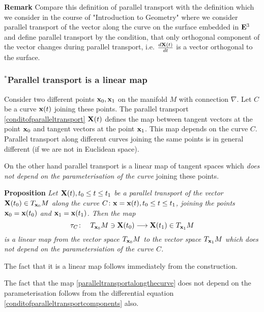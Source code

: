 \documentclass[12pt]{article}
\theoremstyle{theorem}
\numberwithin{equation}{section}
\begin{document}
{  \m


{\bf Remark} Compare this definition of parallel transport with the definition which we consider
in the course of "Introduction to Geometry" where we consider parallel transport of the vector along the
curve on the surface embedded in ${\bf E}^3$ and define parallel transport by the condition, that only orthogonal component
of the vector changes during parallel transport, i.e.
${d{\bf X}(t)\over dt}$ is a vector orthogonal to the surface.

\subsubsection {$^*$Parallel transport is a linear map }

{\small Consider two different points ${\bf x}_0,{\bf x}_1$ on the manifold  $M$ with connection $\nabla$.
Let $C$ be a curve ${\bf x}(t)$ joining these points.
The parallel transport \eqref{conditofparalleltransport}  ${\bf X}(t)$ defines the map between  tangent vectors
at the point ${\bf x}_0$ and tangent vectors at the point ${\bf x}_1$. This map depends on the curve $C$. Parallel
transport along different curves joining the same points is in general different (if we are not in Euclidean space).

On the other hand parallel transport is a linear map of tangent spaces which {\it does not depend on the
parameterisation of the curve} joining these points.

\m

{\bf Proposition}  {\it Let ${\bf X}(t), t_0\leq t\leq t_1$ be a parallel transport of the vector ${\bf X}(t_0)\in T_{{\bf x}_0}M$
along the curve $C\colon {\bf x}={\bf x}(t), t_0\leq t\leq t_1$, joining the points ${\bf x}_0={\bf x}(t_0)$ and ${\bf x}_1={\bf x}(t_1)$.
 Then the map
      \begin{equation}\label{paralleltransportalongthecurve}
 \tau_{C}\colon \quad   T_{{\bf x}_0}M \ni  {\bf X}(t_0)\longrightarrow  {\bf X}(t_1)\in T_{{\bf x}_1}M
               \end{equation}
 is a linear map from the vector space  $T_{{\bf x}_0}M$ to the vector space $T_{{\bf x}_1}M$
   which does not depend on the parametersiation of the curve $C$.}

The fact that it is a linear map follows immediately from the construction.

The fact that the map \eqref{paralleltransportalongthecurve} does not depend on the parameterisation
follows from the differential equation \eqref{conditofparalleltransportcomponents} also.}




}
\end{document}
